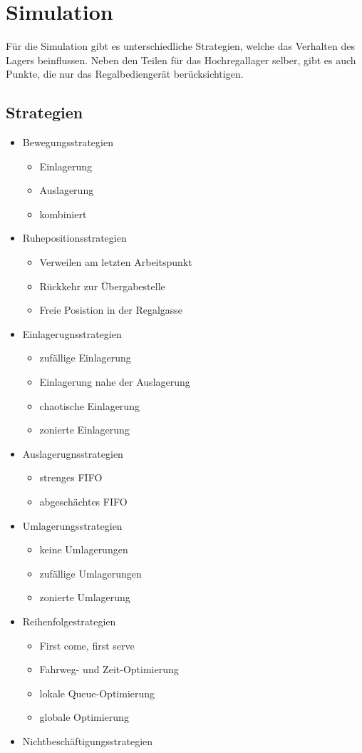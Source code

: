 \section{Simulation}
Für die Simulation gibt es unterschiedliche Strategien, welche das Verhalten des Lagers beinflussen. Neben den Teilen für das Hochregallager selber, gibt es auch Punkte, die nur das Regalbediengerät berücksichtigen.

\subsection{Strategien}
\begin{itemize}
 \item Bewegungsstrategien
 \begin{itemize}
  \item Einlagerung
  \item Auslagerung
  \item kombiniert
\end{itemize}
 \item Ruhepositionsstrategien
 \begin{itemize}
  \item Verweilen am letzten Arbeitspunkt
  \item Rückkehr zur Übergabestelle
  \item Freie Posistion in der Regalgasse
\end{itemize}
 \item Einlagerugnsstrategien
 \begin{itemize}
  \item zufällige Einlagerung
  \item Einlagerung nahe der Auslagerung
  \item chaotische Einlagerung
  \item zonierte Einlagerung
\end{itemize}
 \item Auslagerugnsstrategien
 \begin{itemize}
  \item strenges FIFO
  \item abgeschächtes FIFO
\end{itemize}
 \item Umlagerungsstrategien
 \begin{itemize}
  \item keine Umlagerungen
  \item zufällige Umlagerungen
  \item zonierte Umlagerung
\end{itemize}
 \item Reihenfolgestrategien
 \begin{itemize}
  \item First come, first serve
  \item Fahrweg- und Zeit-Optimierung
  \item lokale Queue-Optimierung
  \item globale Optimierung
\end{itemize}
 \item Nichtbeschäftigungsstrategien
\end{itemize}




